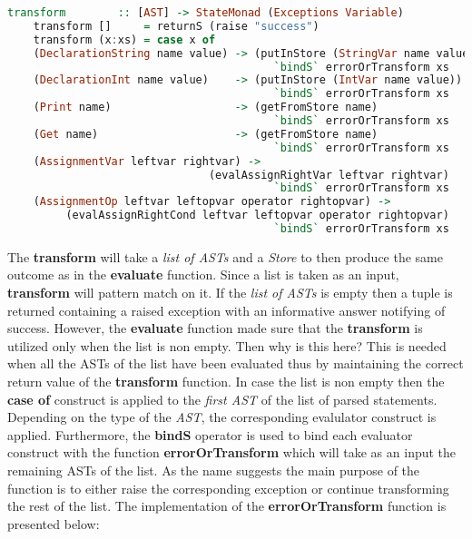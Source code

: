 \documentclass[a4paper, onecolumn]{article}
\begin{document}
    \begin{tcolorbox}
    \begin{lstlisting}[language=Haskell] 
    transform        :: [AST] -> StateMonad (Exceptions Variable) 
    transform []     = returnS (raise "success")
    transform (x:xs) = case x of 
    (DeclarationString name value) -> (putInStore (StringVar name value))
                                         `bindS` errorOrTransform xs
    (DeclarationInt name value)    -> (putInStore (IntVar name value))
                                         `bindS` errorOrTransform xs
    (Print name)                   -> (getFromStore name)
                                         `bindS` errorOrTransform xs
    (Get name)                     -> (getFromStore name)
                                         `bindS` errorOrTransform xs
    (AssignmentVar leftvar rightvar) -> 
                               (evalAssignRightVar leftvar rightvar)
                                         `bindS` errorOrTransform xs
    (AssignmentOp leftvar leftopvar operator rightopvar) ->
         (evalAssignRightCond leftvar leftopvar operator rightopvar) 
                                         `bindS` errorOrTransform xs
    \end{lstlisting}
    \end{tcolorbox}
    
    \noindent The \textbf{transform} will take a \textit{list of ASTs} and a \textit{Store} to then produce the same outcome as in the \textbf{evaluate} function. Since a list is taken as an input, \textbf{transform} will pattern match on it. If the \textit{list of ASTs} is empty then a tuple is returned containing a raised exception with an informative answer notifying of success. However, the \textbf{evaluate} function made sure that the \textbf{transform} is utilized only when the list is non empty. Then why is this here? This is needed when all the ASTs of the list have been evaluated thus by maintaining the correct return value of the \textbf{transform} function. In case the list is non empty then the \textbf{case of} construct is applied to the \textit{first AST} of the list of parsed statements. Depending on the type of the \textit{AST}, the corresponding evalulator construct is applied. Furthermore, the \textbf{bindS} operator is used to bind each evaluator construct with the function \textbf{errorOrTransform} which will take as an input the remaining ASTs of the list. As the name suggests the main purpose of the function is to either raise the corresponding exception or continue transforming the rest of the list. The implementation of the \textbf{errorOrTransform} function is presented below: 
    
\end{document}
